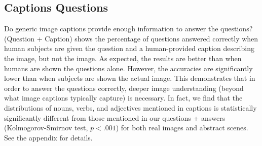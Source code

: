 \subsection{Captions \textbf{\vs} Questions}


Do generic image captions provide enough information to answer the questions?
 (Question + Caption) shows the percentage of questions answered
correctly when human subjects are given the question and a human-provided caption
describing the image, but not the image. As expected, the results are better than when humans are shown the questions alone.
However, the accuracies are significantly lower than when subjects are shown the actual image.
This demonstrates that in order to answer the questions correctly, deeper image understanding 
(beyond what image captions typically capture) is necessary. In fact, we find that the distributions of nouns, verbs, and adjectives mentioned in captions is statistically significantly different from those mentioned in our questions + answers (Kolmogorov-Smirnov test, $p<.001$) for both real images and abstract scenes. See the appendix for details. 
